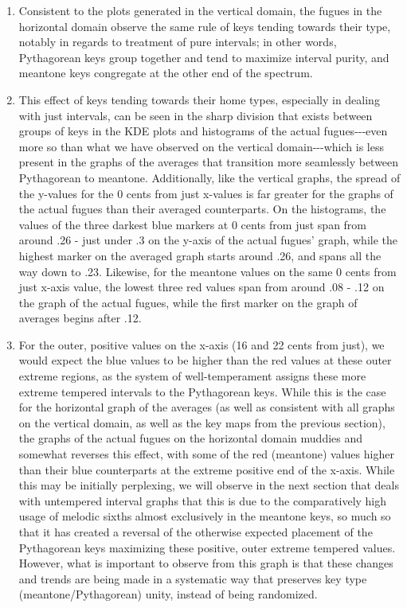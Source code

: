\begin{enumerate}
\def\labelenumi{\arabic{enumi}.}
\tightlist
\item
  Consistent to the plots generated in the vertical domain, the fugues
  in the horizontal domain observe the same rule of keys tending towards
  their type, notably in regards to treatment of pure intervals; in
  other words, Pythagorean keys group together and tend to maximize
  interval purity, and meantone keys congregate at the other end of the
  spectrum.
\item
  This effect of keys tending towards their home types, especially in
  dealing with just intervals, can be seen in the sharp division that
  exists between groups of keys in the KDE plots and histograms of the
  actual fugues-\/-\/-even more so than what we have observed on the
  vertical domain-\/-\/-which is less present in the graphs of the
  averages that transition more seamlessly between Pythagorean to
  meantone. Additionally, like the vertical graphs, the spread of the
  y-values for the 0 cents from just x-values is far greater for the
  graphs of the actual fugues than their averaged counterparts. On the
  histograms, the values of the three darkest blue markers at 0 cents
  from just span from around .26 - just under .3 on the y-axis of the
  actual fugues' graph, while the highest marker on the averaged graph
  starts around .26, and spans all the way down to .23. Likewise, for
  the meantone values on the same 0 cents from just x-axis value, the
  lowest three red values span from around .08 - .12 on the graph of the
  actual fugues, while the first marker on the graph of averages begins
  after .12.
\item
  For the outer, positive values on the x-axis (16 and 22 cents from
  just), we would expect the blue values to be higher than the red
  values at these outer extreme regions, as the system of
  well-temperament assigns these more extreme tempered intervals to the
  Pythagorean keys. While this is the case for the horizontal graph of
  the averages (as well as consistent with all graphs on the vertical
  domain, as well as the key maps from the previous section), the graphs
  of the actual fugues on the horizontal domain muddies and somewhat
  reverses this effect, with some of the red (meantone) values higher
  than their blue counterparts at the extreme positive end of the
  x-axis. While this may be initially perplexing, we will observe in the
  next section that deals with untempered interval graphs that this is
  due to the comparatively high usage of melodic sixths almost
  exclusively in the meantone keys, so much so that it has created a
  reversal of the otherwise expected placement of the Pythagorean keys
  maximizing these positive, outer extreme tempered values. However,
  what is important to observe from this graph is that these changes and
  trends are being made in a systematic way that preserves key type
  (meantone/Pythagorean) unity, instead of being randomized.
\end{enumerate}

